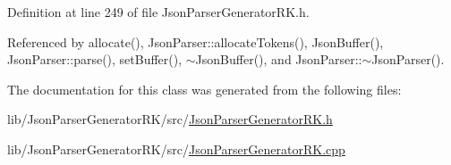 Definition at line 249 of file Json\+Parser\+Generator\+R\+K.\+h.



Referenced by allocate(), Json\+Parser\+::allocate\+Tokens(), Json\+Buffer(), Json\+Parser\+::parse(), set\+Buffer(), $\sim$\+Json\+Buffer(), and Json\+Parser\+::$\sim$\+Json\+Parser().



The documentation for this class was generated from the following files\+:\begin{DoxyCompactItemize}
\item 
lib/\+Json\+Parser\+Generator\+R\+K/src/\hyperlink{_json_parser_generator_r_k_8h}{Json\+Parser\+Generator\+R\+K.\+h}\item 
lib/\+Json\+Parser\+Generator\+R\+K/src/\hyperlink{_json_parser_generator_r_k_8cpp}{Json\+Parser\+Generator\+R\+K.\+cpp}\end{DoxyCompactItemize}
